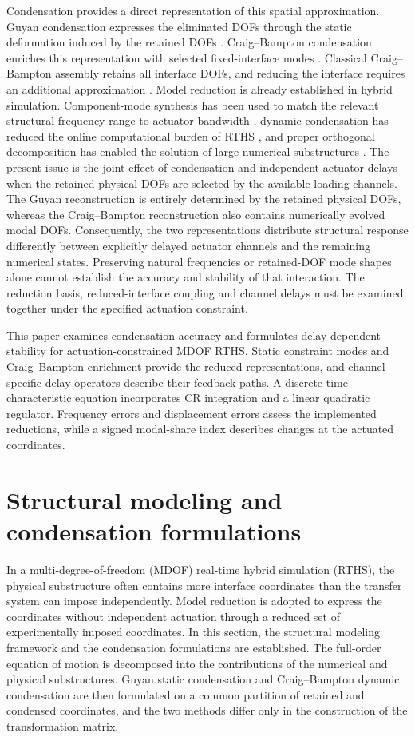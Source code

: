 \documentclass[a4paper,fleqn,review,12pt]{cas-sc}
\numberwithin{equation}{section}
\newcommand{\rev}[1]{{\color{red}#1}}
\begin{document}
Condensation provides a direct representation of this spatial approximation. Guyan condensation expresses the eliminated DOFs through the static deformation induced by the retained DOFs \cite{Guyan1965}. Craig--Bampton condensation enriches this representation with selected fixed-interface modes \cite{Craig1968}. Classical Craig--Bampton assembly retains all interface DOFs, and reducing the interface requires an additional approximation \cite{Krattiger2019}. Model reduction is already established in hybrid simulation. Component-mode synthesis has been used to match the relevant structural frequency range to actuator bandwidth \cite{Miraglia2020}, dynamic condensation has reduced the online computational burden of RTHS \cite{Mucha2023}, and proper orthogonal decomposition has enabled the solution of large numerical substructures \cite{ZhangPOD2024}. The present issue is the joint effect of condensation and independent actuator delays when the retained physical DOFs are selected by the available loading channels. The Guyan reconstruction is entirely determined by the retained physical DOFs, whereas the Craig--Bampton reconstruction also contains numerically evolved modal DOFs. Consequently, the two representations distribute structural response differently between explicitly delayed actuator channels and the remaining numerical states. Preserving natural frequencies or retained-DOF mode shapes alone cannot establish the accuracy and stability of that interaction. The reduction basis, reduced-interface coupling and channel delays must be examined together under the specified actuation constraint.

\rev{This paper examines condensation accuracy and formulates delay-dependent stability for actuation-constrained MDOF RTHS. Static constraint modes and Craig--Bampton enrichment provide the reduced representations, and channel-specific delay operators describe their feedback paths. A discrete-time characteristic equation incorporates CR integration and a linear quadratic regulator. Frequency errors and displacement errors assess the implemented reductions, while a signed modal-share index describes changes at the actuated coordinates.}


\section{Structural modeling and condensation formulations} \label{sec2}

In a multi-degree-of-freedom (MDOF) real-time hybrid simulation (RTHS), the physical substructure often contains more interface coordinates than the transfer system can impose independently. Model reduction is adopted to express the coordinates without independent actuation through a reduced set of experimentally imposed coordinates.
In this section, the structural modeling framework and the condensation formulations are established. The full-order equation of motion is decomposed into the contributions of the numerical and physical substructures. Guyan static condensation and Craig--Bampton dynamic condensation are then formulated on a common partition of retained and condensed coordinates, and the two methods differ only in the construction of the transformation matrix.
\end{document}
